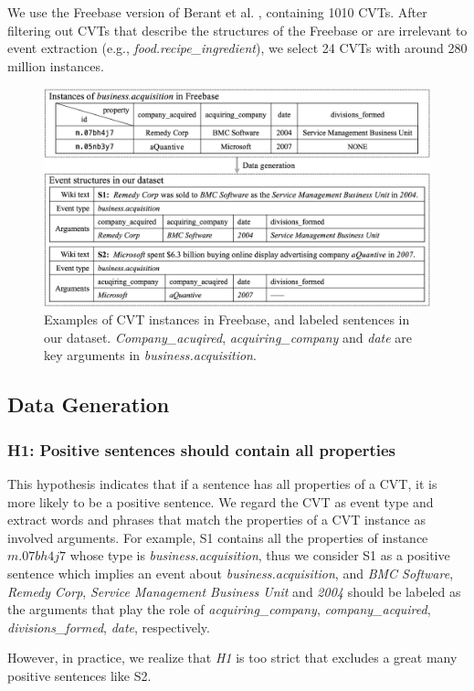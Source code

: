 We use the Freebase version of Berant et al. , containing 1010 CVTs. After filtering out CVTs that describe the structures of the Freebase or are irrelevant to event extraction (e.g., \emph{food.recipe\_ingredient}), we select 24 CVTs with around 280 million instances.

\begin{figure}[h]
	\centering
	\includegraphics[width=.48\textwidth]{temp}
	\caption{Examples of CVT instances in Freebase, and labeled sentences in our dataset. \emph{Company\_acuqired}, \emph{acquiring\_company} and \emph{date} are key arguments in \emph{business.acquisition}. \label{fig:3}}
\end{figure}

\subsection{Data Generation\label{datagen}}
\subsubsection{H1: Positive sentences should contain all properties}
This hypothesis indicates that if a sentence has all properties of a CVT, it is more likely to be a positive sentence. We regard the CVT as event type and extract words and phrases that match the properties of a CVT instance as involved arguments. For example, S1 contains all the properties of instance $m.07bh4j7$ whose type is \emph{business.acquisition}, thus we consider S1 as a positive sentence which implies an event about \emph{business.acquisition}, and \emph{BMC Software}, \emph{Remedy Corp}, \emph{Service Management Business Unit} and \emph{2004} should be labeled as the arguments that play the role of \emph{acquiring\_company}, \emph{company\_acquired}, \emph{divisions\_formed}, \emph{date}, respectively.

However, in practice, we realize that \emph{H1} is too strict that excludes a great many positive sentences like S2. 

